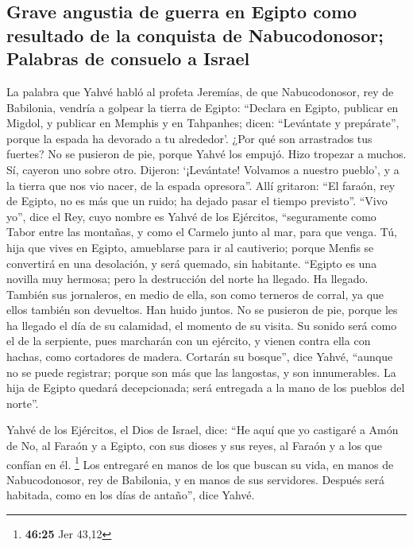 \begin{paracol}{2}
\hypertarget{grave-angustia-de-guerra-en-egipto-como-resultado-de-la-conquista-de-nabucodonosor-palabras-de-consuelo-a-israel}{%
\subsection{Grave angustia de guerra en Egipto como resultado de la
conquista de Nabucodonosor; Palabras de consuelo a
Israel}\label{grave-angustia-de-guerra-en-egipto-como-resultado-de-la-conquista-de-nabucodonosor-palabras-de-consuelo-a-israel}}

 La palabra que Yahvé habló al profeta Jeremías, de que
Nabucodonosor, rey de Babilonia, vendría a golpear la tierra de Egipto:
 ``Declara en Egipto, publicar en Migdol, y publicar en
Memphis y en Tahpanhes; dicen: ``Levántate y prepárate'', porque la
espada ha devorado a tu alrededor'.  ¿Por qué son
arrastrados tus fuertes? No se pusieron de pie, porque Yahvé los empujó.
 Hizo tropezar a muchos. Sí, cayeron uno sobre otro.
Dijeron: `¡Levántate! Volvamos a nuestro pueblo', y a la tierra que nos
vio nacer, de la espada opresora''.  Allí gritaron: ``El
faraón, rey de Egipto, no es más que un ruido; ha dejado pasar el tiempo
previsto''.  ``Vivo yo'', dice el Rey, cuyo nombre es
Yahvé de los Ejércitos, ``seguramente como Tabor entre las montañas, y
como el Carmelo junto al mar, para que venga.  Tú, hija
que vives en Egipto, amueblarse para ir al cautiverio; porque Menfis se
convertirá en una desolación, y será quemado, sin habitante.
 ``Egipto es una novilla muy hermosa; pero la destrucción
del norte ha llegado. Ha llegado.  También sus
jornaleros, en medio de ella, son como terneros de corral, ya que ellos
también son devueltos. Han huido juntos. No se pusieron de pie, porque
les ha llegado el día de su calamidad, el momento de su visita.
 Su sonido será como el de la serpiente, pues marcharán
con un ejército, y vienen contra ella con hachas, como cortadores de
madera.  Cortarán su bosque'', dice Yahvé, ``aunque no se
puede registrar; porque son más que las langostas, y son innumerables.
 La hija de Egipto quedará decepcionada; será entregada a
la mano de los pueblos del norte''.

 Yahvé de los Ejércitos, el Dios de Israel, dice: ``He
aquí que yo castigaré a Amón de No, al Faraón y a Egipto, con sus dioses
y sus reyes, al Faraón y a los que confían en él. \footnote{\textbf{46:25}
  Jer 43,12}  Los entregaré en manos de los que buscan su
vida, en manos de Nabucodonosor, rey de Babilonia, y en manos de sus
servidores. Después será habitada, como en los días de antaño'', dice
Yahvé.


\end{paracol}
